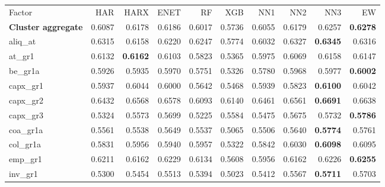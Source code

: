 \begin{longtable}{>{\raggedright\arraybackslash}p{2.6cm}rrrrrrrrr}
\hline
\multicolumn{10}{@{}l}{\textit{Panel C. Investment}} \\
\hline
Factor & HAR & HARX & ENET & RF & XGB & NN1 & NN2 & NN3 & EW \\
\hline
\textbf{Cluster aggregate} & 0.6087 & \cellcolor{blue!10}0.6178 & \cellcolor{blue!10}0.6186 & 0.6017 & 0.5736 & 0.6055 & \cellcolor{blue!10}0.6179 & \cellcolor{blue!10}0.6257 & \textbf{\cellcolor{blue!10}0.6278} \\
aliq\_at & 0.6315 & 0.6158 & 0.6220 & 0.6247 & 0.5774 & 0.6032 & \cellcolor{blue!10}0.6327 & \textbf{\cellcolor{blue!10}0.6345} & \cellcolor{blue!10}0.6316 \\
at\_gr1 & 0.6132 & \textbf{\cellcolor{blue!10}0.6162} & 0.6103 & 0.5823 & 0.5365 & 0.5975 & 0.6069 & \cellcolor{blue!10}0.6158 & \cellcolor{blue!10}0.6147 \\
be\_gr1a & 0.5926 & \cellcolor{blue!10}0.5935 & \cellcolor{blue!10}0.5970 & 0.5751 & 0.5326 & 0.5780 & \cellcolor{blue!10}0.5968 & \cellcolor{blue!10}0.5977 & \textbf{\cellcolor{blue!10}0.6002} \\
capx\_gr1 & 0.5937 & \cellcolor{blue!10}0.6044 & \cellcolor{blue!10}0.6000 & 0.5642 & 0.5468 & \cellcolor{blue!10}0.5939 & 0.5823 & \textbf{\cellcolor{blue!10}0.6100} & \cellcolor{blue!10}0.6042 \\
capx\_gr2 & 0.6432 & \cellcolor{blue!10}0.6568 & \cellcolor{blue!10}0.6578 & 0.6093 & 0.6140 & \cellcolor{blue!10}0.6461 & \cellcolor{blue!10}0.6561 & \textbf{\cellcolor{blue!10}0.6691} & \cellcolor{blue!10}0.6638 \\
capx\_gr3 & 0.5324 & \cellcolor{blue!10}0.5573 & \cellcolor{blue!10}0.5699 & 0.5225 & \cellcolor{blue!10}0.5584 & \cellcolor{blue!10}0.5475 & \cellcolor{blue!10}0.5675 & \cellcolor{blue!10}0.5732 & \textbf{\cellcolor{blue!10}0.5786} \\
coa\_gr1a & 0.5561 & 0.5538 & \cellcolor{blue!10}0.5649 & 0.5537 & 0.5065 & 0.5506 & \cellcolor{blue!10}0.5640 & \textbf{\cellcolor{blue!10}0.5774} & \cellcolor{blue!10}0.5761 \\
col\_gr1a & 0.5831 & \cellcolor{blue!10}0.5956 & \cellcolor{blue!10}0.5940 & \cellcolor{blue!10}0.5957 & 0.5322 & \cellcolor{blue!10}0.5842 & \cellcolor{blue!10}0.6030 & \textbf{\cellcolor{blue!10}0.6098} & \cellcolor{blue!10}0.6095 \\
emp\_gr1 & 0.6211 & 0.6162 & \cellcolor{blue!10}0.6229 & 0.6134 & 0.5608 & 0.5956 & 0.6162 & \cellcolor{blue!10}0.6226 & \textbf{\cellcolor{blue!10}0.6255} \\
inv\_gr1 & 0.5300 & \cellcolor{blue!10}0.5454 & \cellcolor{blue!10}0.5513 & \cellcolor{blue!10}0.5394 & 0.5023 & \cellcolor{blue!10}0.5412 & \cellcolor{blue!10}0.5567 & \textbf{\cellcolor{blue!10}0.5711} & \cellcolor{blue!10}0.5703 \\

\end{longtable}
